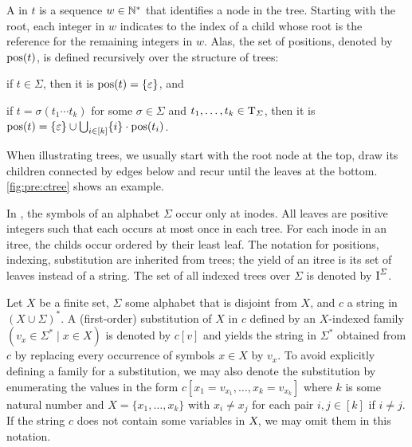 \documentclass[../document.tex]{subfiles}
\begin{document}
    A  in \(t\) is a sequence $w \in \mathbb{N}^*$ that identifies a node in the tree.
    Starting with the root, each integer in \(w\) indicates to the index of a child whose root is the reference for the remaining integers in \(w\).
    Alas, the set of positions, denoted by \(\operatorname{pos}(t)\), is defined recursively over the structure of trees:
    \begin{inparaenum}
        \item if \(t \in \varSigma\), then it is \(\operatorname{pos}(t) = \{\varepsilon\}\), and
        \item if \(t = \sigma(t_1 \cdots t_k)\) for some \(\sigma\in \varSigma\) and \(t_1, \ldots, t_k \in \operatorname{T}_\varSigma\), then it is \(\operatorname{pos}(t) = \{\varepsilon\} \cup \bigcup_{i\in[k]} \{i\}\cdot \operatorname{pos}(t_i)\).
    \end{inparaenum}
    When illustrating trees, we usually start with the root node at the top, draw its children connected by edges below and recur until the leaves at the bottom.
    \cref{fig:pre:ctree} shows an example.

    In , the symbols of an alphabet \(\varSigma\) occur only at \glspl*{inode}.
    All leaves are positive integers such that each occurs at most once in each \gls*{tree}.
    For each \gls*{inode} in an \gls*{itree}, the \glspl{child} occur ordered by their least \gls*{leaf}.
    The notation for positions, indexing, substitution are inherited from trees; the yield of an \gls*{itree} is its set of leaves instead of a string.
    The set of all indexed trees over \(\varSigma\) is denoted by \(\operatorname{I}^\varSigma\).

    Let \(X\) be a finite set, \(\varSigma\) some alphabet that is disjoint from \(X\), and \(c\) a string in \((X \cup \varSigma)^*\).
    A (first-order) substitution of \(X\) in \(c\) defined by an \(X\)-indexed family \((v_x \in \varSigma^* \mid x \in X)\) is denoted by \(c[v]\) and yields the string in \(\varSigma^*\) obtained from \(c\) by replacing every occurrence of symbols \(x \in X\) by \(v_x\).
    To avoid explicitly defining a family for a substitution, we may also denote the substitution by enumerating the values in the form \(c[x_1=v_{x_1}, \ldots, x_{k}=v_{x_k}]\) where \(k\) is some natural number and \(X = \{x_1, \ldots, x_k\}\) with \(x_i \neq x_j\) for each pair \(i,j \in [k]\) if \(i\neq j\).
    If the string \(c\) does not contain some variables in \(\textsl{X}\), we may omit them in this notation.
\end{document}
